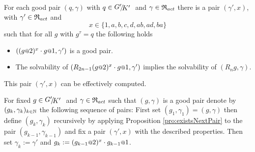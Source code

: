 \documentclass[a4paper,12pt]{article}
\begin{document}
\begin{pro}\label{pro:existsNextPair}
 For each good pair $(q,\gamma)$ with $q\in\RNK{G'}{K'}$ and $\gamma\in\mathfrak{R}_{act}$ there
 is a pair $(\gamma',x)$, with $\gamma'\in\mathfrak{R}_{act}$ and 
 \[x\in \{1,a,b,c,d,ab,ad,ba\}\] 
 such that for all $g$ with $g^\tau =q$ the following holds
 \begin{itemize}
  \item $((g\at{2})^x \cdot g\at{1},\gamma')$ is a good pair.
  \item The solvability of $(R_{2n-1} (g\at{2})^x \cdot g\at{1},\gamma')$ implies
  the solvability of $(R_ng,\gamma)$.
 \end{itemize}
 This pair $(\gamma',x)$ can be effectively computed. 
\end{pro}
 For fixed $g\in\RNK{G'}{K'}$ and $\gamma\in \mathfrak{R}_{act}$ such that $(g,\gamma)$ is a good pair
 denote by $(g_k,\gamma_k)_{k\in\mathbb{N}}$ the following sequence of pairs:
 First set $(g_1,\gamma_1)=(g,\gamma)$ then define $(g_k,\gamma_k)$ recursively by applying Proposition \ref{pro:existsNextPair}
 to the pair $(g_{k-1},\gamma_{k-1})$ and fix a pair $(\gamma',x)$ with the described properties.
 Then set $\gamma_k := \gamma'$ and $g_k:=(g_{k-1}\at{2})^{x} \cdot g_{k-1}\at{1}$.
 
 
\end{document}
